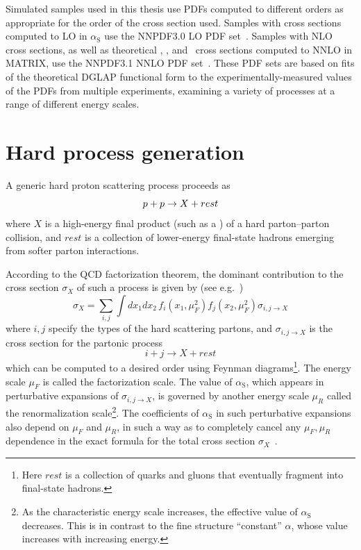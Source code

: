 \documentclass[oneside, letterpaper, 12pt, oldfontcommands]{memoir}
\begin{document}
Simulated samples used in this thesis use PDFs computed to different orders as appropriate for the order
of the cross section used. Samples with cross sections computed to LO in $\alpha_\mathrm{S}$ use the NNPDF3.0 LO PDF
set~\cite{ref:NNPDF30}. Samples with NLO cross sections, as well as theoretical \zinvg, \wlng, and \zllg\ cross sections
computed to NNLO in MATRIX, use the NNPDF3.1 NNLO PDF set~\cite{ref:NNPDF31}.
These PDF sets are based on fits of the theoretical DGLAP functional form to the experimentally-measured values
of the PDFs from multiple experiments, examining a variety of processes at a range of different energy scales.

\section{Hard process generation} \label{sec:simulation_hard_process}
A generic hard proton scattering process proceeds as
\begin{equation}
p + p \to X + rest
\end{equation}
where $X$ is a high-energy final product (such as a \Pgamma) of a hard parton--parton collision, and $rest$ is a collection of
lower-energy final-state hadrons emerging from softer parton interactions.

According to the QCD factorization theorem, the dominant contribution to the cross section $\sigma_{X}$ of such a process is given by (see e.g.~\cite{ref:BargerPhillips})
\begin{equation}
\sigma_{X} = \sum_{i,j}\int \! dx_{1}dx_{2} \, f_{i}(x_{1}, \mu_{F}^{2})f_{j}(x_{2}, \mu_{F}^{2})\sigma_{i,j \to X}
\end{equation}
where $i,j$ specify the types of the hard scattering partons, and $\sigma_{i,j \to X}$ is the cross section for the partonic process
\begin{equation}
i + j \to X + rest
\end{equation}
which can be computed to a desired order using Feynman diagrams\footnote{Here $rest$ is a collection of quarks and gluons
that eventually fragment into final-state hadrons.}. The energy scale $\mu_{F}$ is called the factorization scale.
The value of $\alpha_\mathrm{S}$, which appears in perturbative expansions of $\sigma_{i,j \to X}$, is governed by another energy scale $\mu_{R}$ called
the renormalization scale\footnote{As the characteristic
energy scale increases, the effective value of $\alpha_\mathrm{S}$ decreases. This is in contrast to the fine structure ``constant'' $\alpha$,
whose value increases with increasing energy.}.
The coefficients of $\alpha_\mathrm{S}$ in such perturbative expansions also depend on $\mu_{F}$ and $\mu_{R}$,
in such a way as to completely cancel any $\mu_{F}, \mu_{R}$ dependence in the exact formula for the total cross section $\sigma_{X}$~\cite{ref:0034-4885/70/1/R02}.
\end{document}

